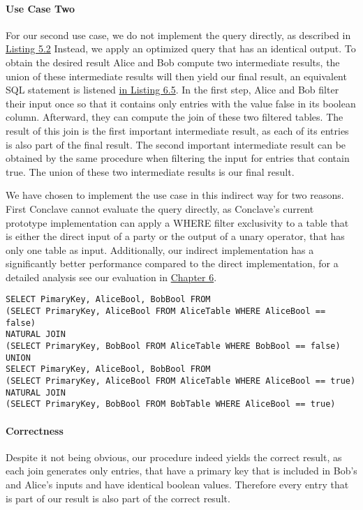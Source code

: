 \paragraph{Use Case Two}
\label{use_case2}
For our second use case, we do not implement the query directly, as described in \hyperref[SQL2_label]{Listing 5.2}  Instead, we apply an optimized query that has an identical output. To obtain the desired result Alice and Bob compute two intermediate results, the union of these intermediate results will then yield our final result, an equivalent SQL statement is listened \hyperref[use_case2_alternative_sql]{ in Listing 6.5}.
In the first step, Alice and Bob filter their input once so that it contains only entries with the value false in its boolean column. Afterward, they can compute the join of these two filtered tables. The result of this join is the first important intermediate result, as each of its entries is also part of the final result. The second important intermediate result can be obtained by the same procedure when filtering the input for entries that contain true.
The union of these two intermediate results is our final result. 

We have chosen to implement the use case in this indirect way for two reasons. First Conclave cannot evaluate the query directly, as Conclave's current prototype implementation can apply a WHERE filter exclusivity to a table that is either the direct input of a party or the output of a unary operator, that has only one table as input. Additionally, our indirect implementation has a significantly better performance compared to the direct implementation, for a detailed analysis see our evaluation in \hyperref[evaluation]{Chapter 6}.   


\label{use_case2_alternative_sql}
\begin{lstlisting}[caption={Functional equivalent SQL statement for our optimitized implementation of our second use case}]
SELECT PimaryKey, AliceBool, BobBool FROM
(SELECT PrimaryKey, AliceBool FROM AliceTable WHERE AliceBool == false) 
NATURAL JOIN	
(SELECT PrimaryKey, BobBool FROM AliceTable WHERE BobBool == false)	
UNION
SELECT PimaryKey, AliceBool, BobBool FROM
(SELECT PrimaryKey, AliceBool FROM AliceTable WHERE AliceBool == true) 
NATURAL JOIN	
(SELECT PrimaryKey, BobBool FROM BobTable WHERE AliceBool == true)
\end{lstlisting}

\paragraph{Correctness}
Despite it not being obvious, our procedure indeed yields the correct result, as each join generates only entries, that have a primary key that is included in Bob's and Alice's inputs and have identical boolean values. Therefore every entry that is part of our result is also part of the correct result.

